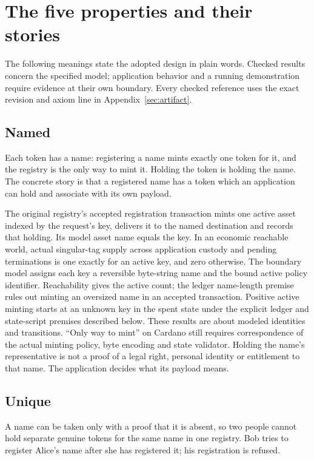 \section{The five properties and their stories}
\label{sec:five-properties}
The following meanings state the adopted design in plain words. Checked
results concern the specified model; application behavior and a running
demonstration require evidence at their own boundary. Every checked reference
uses the exact revision and axiom line in Appendix~\ref{sec:artifact}.

\subsection{Named}
Each token has a name: registering a name mints exactly one token for it,
and the registry is the only way to mint it. Holding the token is holding
the name. The concrete story is that a registered name has a token which
an application can hold and associate with its own payload.

\checked The original registry's accepted registration transaction mints
one active asset indexed by the request's key, delivers it to the named
destination and records that holding. Its model asset name equals the key.
\checked In an economic reachable world, actual singular-tag supply across
application custody and pending terminations is one exactly for an active
key, and zero otherwise.
\checked The boundary model assigns each key a reversible byte-string name
and the bound active policy identifier. Reachability gives the active count;
the ledger name-length premise rules out minting an oversized name in an
accepted transaction.
\checked Positive active minting starts at an unknown key in the spent
state under the explicit ledger and state-script premises described below.
\missing These results are about modeled identities and transitions.
``Only way to mint'' on Cardano still requires correspondence of the actual
minting policy, byte encoding and state validator. Holding the name's representative is not a proof
of a legal right, personal identity or entitlement to that name. The
application decides what its payload means.

\subsection{Unique}
A name can be taken only with a proof that it is absent, so two people cannot
hold separate genuine tokens for the same name in one registry. Bob tries
to register Alice's name after she has registered it; his registration is
refused.

